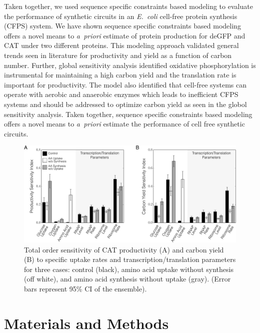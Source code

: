 \documentclass[journal=asbcd6,manuscript=article]{achemso}
\begin{document}
Taken together, we used sequence specific constraints based modeling to evaluate the performance of synthetic circuits in an \emph{E.~coli} cell-free protein synthesis (CFPS) system.
We have shown sequence specific constraints based modeling offers a novel means to \emph{a~priori} estimate of protein production for deGFP and CAT under two different proteins.
This modeling approach validated general trends seen in literature for productivity and yield as a function of carbon number. 
Further, global sensitivity analysis identified oxidative phosphorylation is instrumental for maintaining a high carbon yield and the translation rate is important for productivity.
The model also identified that cell-free systems can operate with aerobic and anaerobic enzymes which leads to inefficient CFPS systems and should be addressed to optimize carbon yield as seen in the globol sensitivity analysis. 
Taken together, sequence specific constraints based modeling offers a novel means to \emph{a~priori} estimate the performance of cell free synthetic circuits.



\begin{figure}[h!]
\includegraphics[width=1.00\textwidth]{./Figures/SI_CAT.pdf}
\caption{Total order sensitivity of CAT productivity (A) and carbon yield (B) to specific uptake rates and transcription/translation parameters for three cases: control (black), amino acid uptake without synthesis (off white), and amino acid synthesis without uptake (gray). (Error bars represent 95\% CI of the ensemble).}
\label{fig:SI_CAT}
\end{figure}


\section*{Materials and Methods}
\end{document}

